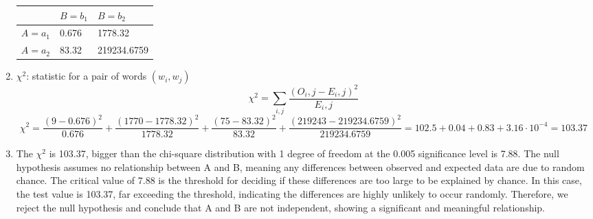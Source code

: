 \documentclass{article}
\begin{document}
\begin{enumerate}
\renewcommand{\arraystretch}{1}
	\begin{center}
	\begin{tabular} { | m{2cm} | m{2cm} | m{2cm} |  }
		\hline
		 & $B = b_1$ & $B = b_2$ \\
		\hline
		$A = a_1$ & 0.676 & 1778.32 \\
		\hline
		$A = a_2$ & 83.32 & 219234.6759 \\
		\hline
	\end{tabular}
	\end{center}
	\item $\chi^2$: statistic for a pair of words $(w_i, w_j)$
	\begin{equation*}
		\chi^2 = \sum_{i,j} \frac{(O_i,j - E_i,j)^2}{E_i,j}
	\end{equation*}
	\begin{equation*}
	\chi^2 = \frac{(9-0.676)^2}{0.676} + \frac{(1770-1778.32)^2}{1778.32} + \frac{(75-83.32)^2}{83.32} + \frac{(219243-219234.6759)^2}{219234.6759} = 102.5 + 0.04 + 0.83 + 3.16 \cdot 10^{-4} = 103.37
	\end{equation*}

	\item The $\chi^2$ is 103.37, bigger than the chi-square distribution with 1 degree of freedom at the 0.005 significance level is 7.88. The null hypothesis assumes no relationship between A and B, meaning any differences between observed and expected data are due to random chance. The critical value of 7.88 is the threshold for deciding if these differences are too large to be explained by chance. In this case, the test value is 103.37, far exceeding the threshold, indicating the differences are highly unlikely to occur randomly. Therefore, we reject the null hypothesis and conclude that A and B are not independent, showing a significant and meaningful relationship.

	\end{enumerate}
\end{document}
